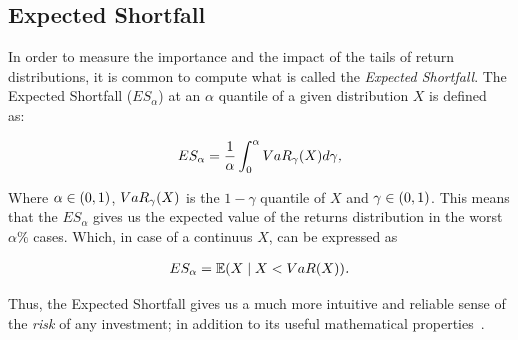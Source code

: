 \subsection*{Expected Shortfall}

In order to measure the importance and the impact of the tails of return distributions, it is common to compute what is called the \textit{Expected Shortfall}. The Expected Shortfall ($ES_{\alpha}$) at an $\alpha$ quantile of a given distribution $X$ is defined~\cite{a:mcneil-es} as:

\begin{align} \label{expected-shortfall}
ES_{\alpha} = \frac{1}{\alpha}\int_{0}^{\alpha}VaR_{\gamma}\qty(X)d\gamma \textit{,}
\end{align}

Where $\alpha \in \qty(0,1)$, $VaR_{\gamma}\qty(X)$ is the $1-\gamma$ quantile of $X$ and $\gamma \in \qty(0,1)$. This means that the $ES_{\alpha}$ gives us the expected value of the returns distribution in the worst $\alpha \%$ cases. Which, in case of a continuus $X$, can be expressed as

\begin{align}
	ES_{\alpha} = \EX\giventhat{X}{X < VaR(X)}\emph{.}
\end{align}

Thus, the Expected Shortfall gives us a much more intuitive and reliable sense of the \textit{risk} of any investment; in addition to its useful mathematical properties~\cite{a:bertsimas-shortfall}.

